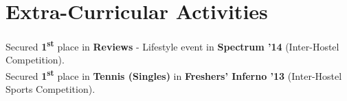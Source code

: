 \documentclass[a4paper]{norm-resume}
\begin{document}
\vspace{0mm}	%

\section{Extra-Curricular Activities \hrulefill}

\vspace{1mm} %
	
	Secured \textbf{1\textsuperscript{st}} place in \textbf{Reviews} - Lifestyle event in \textbf{Spectrum '14} (Inter-Hostel Competition).\\
	Secured \textbf{1\textsuperscript{st}} place in \textbf{Tennis (Singles)} in \textbf{Freshers' Inferno '13} (Inter-Hostel Sports Competition).\\	
\end{document}
